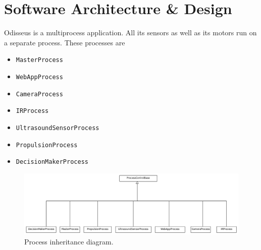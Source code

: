 \section{Software Architecture \& Design}

Odisseus is a multiprocess application. All its sensors as well as its motors run on a separate process.
These processes are

\begin{itemize}
	\item \texttt{MasterProcess}
	\item \texttt{WebAppProcess}
	\item \texttt{CameraProcess}
	\item \texttt{IRProcess}
	\item \texttt{UltrasoundSensorProcess}
	\item \texttt{PropulsionProcess}
	\item \texttt{DecisionMakerProcess}
\end{itemize}

\begin{figure}[!htb]
	\begin{center}
		\includegraphics[scale=0.380]{imgs/design_1.png}
	\end{center}
	\caption{ Process inheritance diagram.}
	\label{design_1}
\end{figure}

